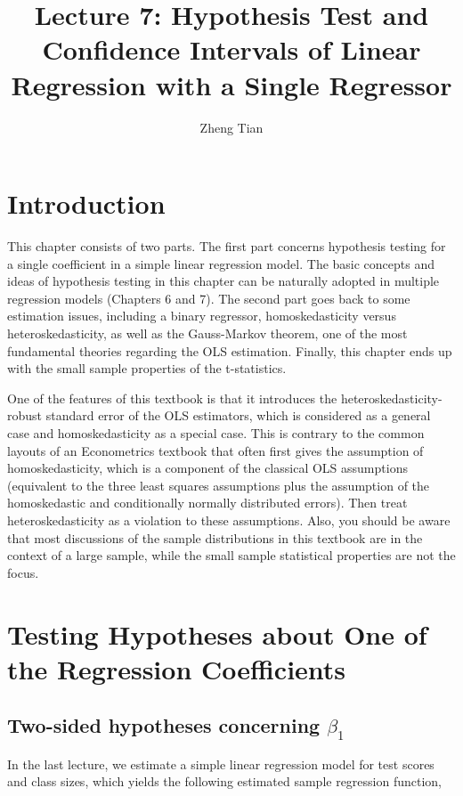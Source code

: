 \documentclass[a4paper,11pt]{article}
\author{Zheng Tian}
\date{}
\title{Lecture 7: Hypothesis Test and Confidence Intervals of Linear Regression with a Single Regressor}
\begin{document}
\maketitle
\setcounter{tocdepth}{1}
\tableofcontents



\section{Introduction}
\label{sec:orgd055162}

This chapter consists of two parts. The first part concerns hypothesis
testing for a single coefficient in a simple linear regression
model. The basic concepts and ideas of hypothesis testing in this
chapter can be naturally adopted in multiple regression models
(Chapters 6 and 7). The second part goes back to some estimation
issues, including a binary regressor, homoskedasticity versus
heteroskedasticity, as well as the Gauss-Markov theorem, one of the
most fundamental theories regarding the OLS estimation. Finally,
this chapter ends up with the small sample properties of the
t-statistics.

One of the features of this textbook is that it introduces the
heteroskedasticity-robust standard error of the OLS estimators, which
is considered as a general case and homoskedasticity as a special
case. This is contrary to the common layouts of an Econometrics
textbook that often first gives the assumption of homoskedasticity,
which is a component of the classical OLS assumptions (equivalent to
the three least squares assumptions plus the assumption of the
homoskedastic and conditionally normally distributed errors). Then
treat heteroskedasticity as a violation to these assumptions. Also,
you should be aware that most discussions of the sample distributions
in this textbook are in the context of a large sample, while the small
sample statistical properties are not the focus.


\section{Testing Hypotheses about One of the Regression Coefficients}
\label{sec:org6adf38b}

\subsection{Two-sided hypotheses concerning \(\beta_1\)}
\label{sec:orgdd8d5f7}

In the last lecture, we estimate a simple linear regression model for test
scores and class sizes, which yields the following estimated sample
regression function,
\end{document}
